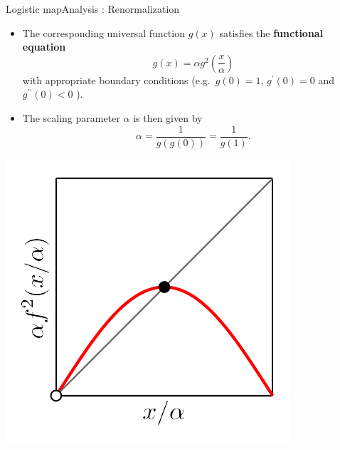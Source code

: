\documentclass[usenames,dvipsnames,svgnames,10pt,aspectratio=169]{beamer}
\begin{document}
\begin{frame}[t, c]{Logistic map}{Analysis : Renormalization}
	\begin{minipage}{.68\textwidth}
		\begin{itemize}
			\item The corresponding universal function \(g(x)\) satisfies the \textbf{functional equation}
			\[
				g(x) = \alpha g^2 \left( \frac{x}{\alpha} \right)
			\]
			with appropriate boundary conditions (e.g.\ \(g(0) = 1\), \(g^{\prime}(0) = 0\) and \(g^{\prime \prime}(0) < 0\) ).

			\medskip

			\item The scaling parameter \( \alpha \) is then given by
			\[
				\alpha = \frac{1}{g(g(0))} = \frac{1}{g(1)}.
			\]
		\end{itemize}
	\end{minipage}%
	\hfill
	\begin{minipage}{.28\textwidth}
		\centering
		\includegraphics[width=\textwidth]{renormalization_3}
	\end{minipage}

	\vspace{1cm}
\end{frame}
\end{document}
